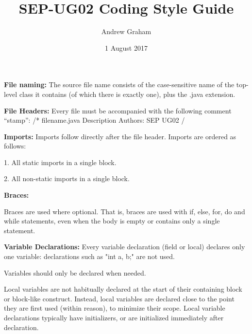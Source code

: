 \documentclass[12pt]{report}
\title{SEP-UG02 Coding Style Guide}
\author{Andrew Graham}
\date{1 August 2017}
\begin{document}
\maketitle
\noindent
\textbf{File naming:} \newline
The source file name consists of the case-sensitive name of the top-level class it contains (of which there is exactly one), plus the .java extension. \newline

\noindent
\textbf{File Headers:} \newline
Every file must be accompanied with the following comment ``stamp'':
\newline   /*
\newline    * filename.java
\newline    *
\newline    * Description
\newline    *
\newline    * Authors: SEP UG02
\newline    */
\newline 

\noindent\textbf{Imports:} \newline   
\noindent
Imports follow directly after the file header. Imports are ordered as follows:

1.	All static imports in a single block.

2.	All non-static imports in a single block.\newline

\noindent\textbf{Braces:} 

\noindent Braces are used where optional. That is, braces are used with if, else, for, do and while statements, even when the body is empty or contains only a single statement.\newline



\noindent
\textbf{Variable Declarations:} \newline
Every variable declaration (field or local) declares only one variable: declarations such as "int a, b;" are not used.

\noindent
Variables should only be declared when needed.

\noindent
Local variables are not habitually declared at the start of their containing block or block-like construct. Instead, local variables are declared close to the point they are first used (within reason), to minimize their scope. Local variable declarations typically have initializers, or are initialized immediately after declaration.\newline
\end{document}
